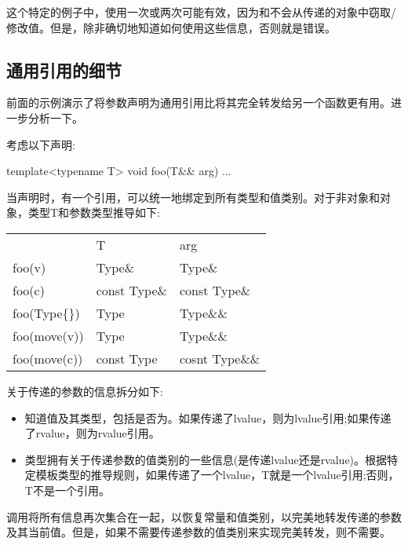 这个特定的例子中，使用一次或两次可能有效，因为和不会从传递的对象中窃取/修改值。但是，除非确切地知道如何使用这些信息，否则就是错误。

\subsection{通用引用的细节}

前面的示例演示了将参数声明为通用引用比将其完全转发给另一个函数更有用。进一步分析一下。

考虑以下声明:

\begin{cppcode}
template<typename T>
void foo(T&& arg) {
	...
}
\end{cppcode}

当声明时，有一个引用，可以统一地绑定到所有类型和值类别。对于非对象和对象，类型T和参数类型推导如下:

\begin{table}[H]
	\begin{tabular}{lll}
		& T            & arg            \\
		foo(v)        & Type\&       & Type\&         \\
		foo(c)        & const Type\& & const Type\&   \\
		foo(Type\{\}) & Type         & Type\&\&       \\
		foo(move(v))  & Type         & Type\&\&       \\
		foo(move(c))  & const Type   & cosnt Type\&\&
	\end{tabular}
\end{table}

关于传递的参数的信息拆分如下:

\begin{itemize}
	\item {}知道值及其类型，包括是否为。如果传递了lvalue，则为lvalue引用;如果传递了rvalue，则为rvalue引用。
	\item {}类型拥有关于传递参数的值类别的一些信息(是传递lvalue还是rvalue)。根据特定模板类型的推导规则，如果传递了一个lvalue，T就是一个lvalue引用;否则，T不是一个引用。
\end{itemize}

调用将所有信息再次集合在一起，以恢复常量和值类别，以完美地转发传递的参数及其当前值。但是，如果不需要传递参数的值类别来实现完美转发，则不需要。

